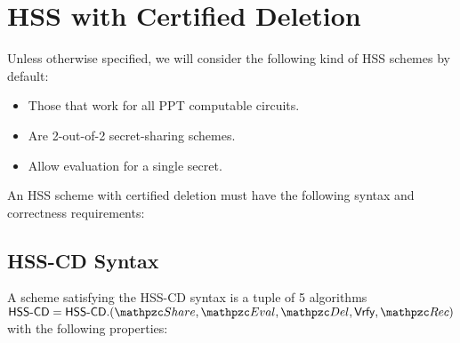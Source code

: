 \section{HSS with Certified Deletion}\label{sec:hss-cd}

Unless otherwise specified, we will consider the following kind of
HSS schemes by default:
\begin{itemize}
\item Those that work for all PPT computable circuits.
\item Are 2-out-of-2 secret-sharing schemes.
\item Allow evaluation for a single secret.
\end{itemize}

An HSS scheme with certified deletion must have the following syntax
and correctness requirements:

\subsection{HSS-CD Syntax}
A scheme satisfying the HSS-CD syntax is a tuple of 5 algorithms
$\HSScd = \HSScd.(\Sh, \Ev, \Del, \Vrfy, \Rec)$ with the following
properties:

